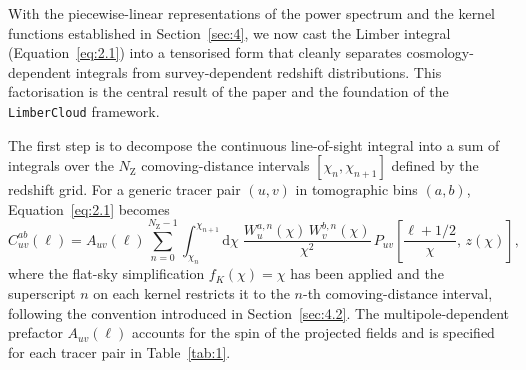 With the piecewise-linear representations of the power spectrum and the kernel functions established in Section~\ref{sec:4}, we now cast the Limber integral (Equation~\ref{eq:2.1}) into a tensorised form that cleanly separates cosmology-dependent integrals from survey-dependent redshift distributions. This factorisation is the central result of the paper and the foundation of the \texttt{LimberCloud} framework.

The first step is to decompose the continuous line-of-sight integral into a sum of integrals over the \(N_\mathrm{Z}\) comoving-distance intervals \([\chi_n, \chi_{n+1}]\) defined by the redshift grid. For a generic tracer pair \((u, v)\) in tomographic bins \((a, b)\), Equation~\ref{eq:2.1} becomes
\begin{equation} \label{eq:5.1}
    C_{uv}^{ab}(\ell) = A_{uv}(\ell) \sum_{n=0}^{N_\mathrm{Z}-1} \int_{\chi_n}^{\chi_{n+1}} \mathrm{d}\chi\; \frac{W_u^{a,n}(\chi)\,W_v^{b,n}(\chi)}{\chi^2}\, P_{uv}\!\left[\frac{\ell + 1/2}{\chi},\, z(\chi)\right],
\end{equation}
where the flat-sky simplification \(f_K(\chi) = \chi\) has been applied and the superscript \(n\) on each kernel restricts it to the \(n\)-th comoving-distance interval, following the convention introduced in Section~\ref{sec:4.2}. The multipole-dependent prefactor \(A_{uv}(\ell)\) accounts for the spin of the projected fields and is specified for each tracer pair in Table~\ref{tab:1}.

